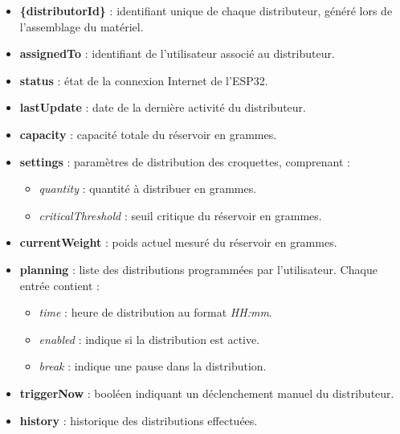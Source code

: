 \begin{enumerate}[label=\alph*)]
\begin{itemize}
\item \textbf{\{distributorId\}} : identifiant unique de chaque distributeur, généré lors de l'assemblage du matériel.
\item \textbf{assignedTo} : identifiant de l'utilisateur associé au distributeur.
\item \textbf{status} : état de la connexion Internet de l'ESP32.
\item \textbf{lastUpdate} : date de la dernière activité du distributeur.
\item \textbf{capacity} : capacité totale du réservoir en grammes.
\item \textbf{settings} : paramètres de distribution des croquettes, comprenant :
  \begin{itemize}
    \item \textit{quantity} : quantité à distribuer en grammes.
    \item \textit{criticalThreshold} : seuil critique du réservoir en grammes.
  \end{itemize}
\item \textbf{currentWeight} : poids actuel mesuré du réservoir en grammes.
\item \textbf{planning} : liste des distributions programmées par l'utilisateur. Chaque entrée contient :
  \begin{itemize}
    \item \textit{time} : heure de distribution au format \textit{HH:mm}.
    \item \textit{enabled} : indique si la distribution est active.
    \item \textit{break} : indique une pause dans la distribution.
  \end{itemize}
\item \textbf{triggerNow} : booléen indiquant un déclenchement manuel du distributeur.
\item \textbf{history} : historique des distributions effectuées.
\end{itemize}

\end{enumerate}

